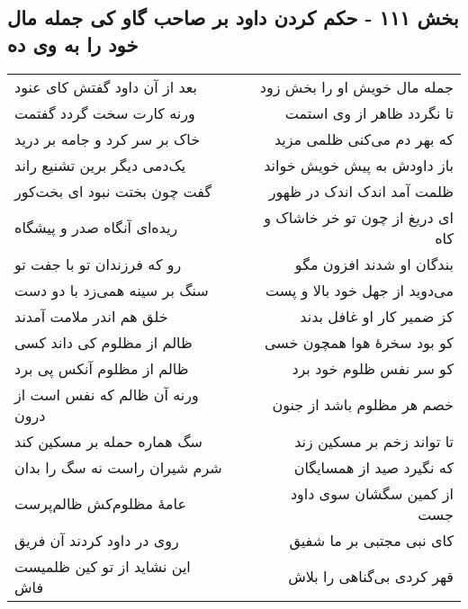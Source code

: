\begin{center}
\section*{بخش ۱۱۱ - حکم کردن داود بر صاحب گاو کی جمله مال خود را به وی ده}
\label{sec:sh111}
\begin{longtable}{l p{0.5cm} r}
بعد از آن داود گفتش کای عنود
&&
جمله مال خویش او را بخش زود
\\
ورنه کارت سخت گردد گفتمت
&&
تا نگردد ظاهر از وی استمت
\\
خاک بر سر کرد و جامه بر درید
&&
که بهر دم می‌کنی ظلمی مزید
\\
یک‌دمی دیگر برین تشنیع راند
&&
باز داودش به پیش خویش خواند
\\
گفت چون بختت نبود ای بخت‌کور
&&
ظلمت آمد اندک اندک در ظهور
\\
ریده‌ای آنگاه صدر و پیشگاه
&&
ای دریغ از چون تو خر خاشاک و کاه
\\
رو که فرزندان تو با جفت تو
&&
بندگان او شدند افزون مگو
\\
سنگ بر سینه همی‌زد با دو دست
&&
می‌دوید از جهل خود بالا و پست
\\
خلق هم اندر ملامت آمدند
&&
کز ضمیر کار او غافل بدند
\\
ظالم از مظلوم کی داند کسی
&&
کو بود سخرهٔ هوا همچون خسی
\\
ظالم از مظلوم آنکس پی برد
&&
کو سر نفس ظلوم خود برد
\\
ورنه آن ظالم که نفس است از درون
&&
خصم هر مظلوم باشد از جنون
\\
سگ هماره حمله بر مسکین کند
&&
تا تواند زخم بر مسکین زند
\\
شرم شیران راست نه سگ را بدان
&&
که نگیرد صید از همسایگان
\\
عامهٔ مظلوم‌کش ظالم‌پرست
&&
از کمین سگشان سوی داود جست
\\
روی در داود کردند آن فریق
&&
کای نبی مجتبی بر ما شفیق
\\
این نشاید از تو کین ظلمیست فاش
&&
قهر کردی بی‌گناهی را بلاش
\\
\end{longtable}
\end{center}
